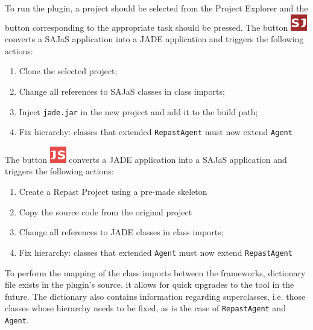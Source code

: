 To run the plugin, a project should be selected from the Project Explorer and the button corresponding to the appropriate task should be pressed. The button \includegraphics[scale=1.0]{figures/sj.pdf} converts a SAJaS application into a JADE application and triggers the following actions:

\begin{samepage}
\begin{enumerate}
  \item Clone the selected project;
  \item Change all references to SAJaS classes in class imports;
  \item Inject \texttt{jade.jar} in the new project and add it to the build path;
  \item Fix hierarchy: classes that extended \texttt{RepastAgent} must now extend \texttt{Agent}
\end{enumerate}
\end{samepage}

The button \includegraphics[scale=1.0]{figures/js.pdf} converts a JADE application into a SAJaS application and triggers the following actions:

\begin{samepage}
\begin{enumerate}
  \item Create a Repast Project using a pre-made skeleton
  \item Copy the source code from the original project
  \item Change all references to JADE classes in class imports;
  \item Fix hierarchy: classes that extended \texttt{Agent} must now extend \texttt{RepastAgent}
\end{enumerate}
\end{samepage}

To perform the mapping of the class imports between the frameworks, dictionary file exists in the plugin's source. it allows for quick upgrades to the tool in the future. The dictionary also contains information regarding superclasses, i.e. those classes whose hierarchy needs to be fixed, as is the case of \texttt{RepastAgent} and \texttt{Agent}.